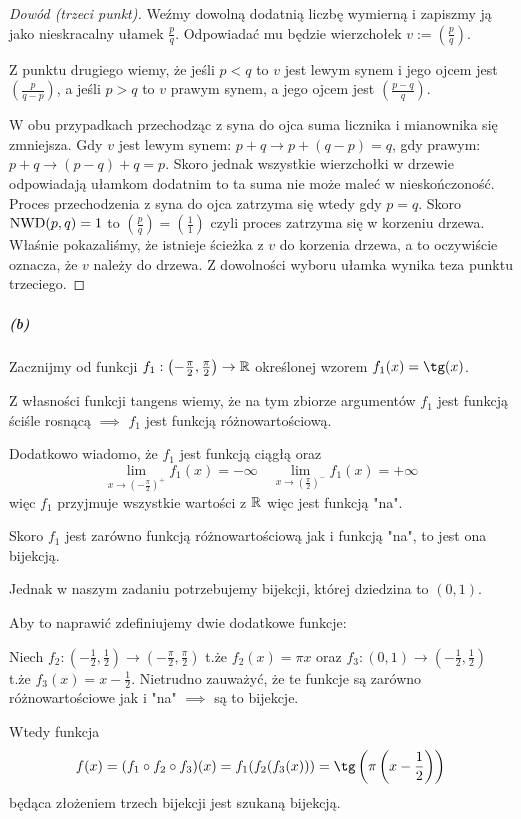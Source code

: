 \begin{proof}[Dowód (trzeci punkt)]
Weźmy dowolną dodatnią liczbę wymierną i zapiszmy ją jako nieskracalny
ułamek $\frac{p}{q}$. Odpowiadać mu będzie wierzchołek 
$v := \left(\frac{p}{q}\right)$.

Z punktu drugiego wiemy, że jeśli $p < q$ to $v$ jest lewym synem
i jego ojcem jest $\left(\frac{p}{q-p}\right)$, a jeśli $p > q$
to $v$ prawym synem, a jego ojcem jest $\left(\frac{p-q}{q}\right)$.

W obu przypadkach przechodząc z syna do ojca suma licznika i mianownika
się zmniejsza. Gdy $v$ jest lewym synem: $p+q \to p+(q-p)=q$, gdy prawym:
$p+q \to (p-q)+q=p$. Skoro jednak wszystkie wierzchołki w drzewie odpowiadają
ułamkom dodatnim to ta suma nie może maleć w nieskończoność. Proces
przechodzenia z syna do ojca zatrzyma się wtedy gdy $p = q$.
Skoro $\mathrm{NWD}(p, q) = 1$ to $\left(\frac{p}{q}\right) = \left(\frac{1}{1}\right)$
czyli proces zatrzyma się w korzeniu drzewa. Właśnie pokazaliśmy, że
istnieje ścieżka z $v$ do korzenia drzewa, a to oczywiście oznacza,
że $v$ należy do drzewa. Z dowolności wyboru ułamka wynika teza punktu trzeciego.
\end{proof}

\subparagraph{(b)}
Zacznijmy od funkcji $f_1: \left(-\frac{\pi}{2}, \frac{\pi}{2}\right) \to \mathbb{R}$
określonej wzorem $f_1(x) = \tg(x)$.

Z własności funkcji tangens wiemy, że na tym zbiorze
argumentów $f_1$ jest funkcją ściśle rosnącą $\implies$
$f_1$ jest funkcją różnowartościową.

Dodatkowo wiadomo, że $f_1$ jest funkcją ciągłą oraz
$$\lim_{x \to (-\frac{\pi}{2})^+} f_1(x) = -\infty \quad \lim_{x \to (\frac{\pi}{2})^-} f_1(x) = +\infty$$
więc $f_1$ przyjmuje wszystkie wartości z $\mathbb{R}$ więc jest funkcją "na".

Skoro $f_1$ jest zarówno funkcją różnowartościową jak i funkcją "na",
to jest ona bijekcją.

Jednak w naszym zadaniu potrzebujemy bijekcji, której dziedzina to $(0,1)$.

Aby to naprawić zdefiniujemy dwie dodatkowe funkcje:

Niech $f_2: \left(-\frac{1}{2}, \frac{1}{2}\right) \to \left(-\frac{\pi}{2}, \frac{\pi}{2}\right)$
t.że $f_2(x) = \pi x$
oraz
$f_3: (0,1) \to \left(-\frac{1}{2}, \frac{1}{2}\right)$ t.że $f_3(x) = x - \frac{1}{2}$.
Nietrudno zauważyć, że te funkcje są zarówno różnowartościowe jak i "na"
$\implies$ są to bijekcje.

Wtedy funkcja
$$f(x) = (f_1 \circ f_2 \circ f_3)(x) = f_1(f_2(f_3(x))) = \tg\left(\pi \left(x - \frac{1}{2}\right)\right)$$
będąca złożeniem trzech bijekcji jest szukaną bijekcją.

